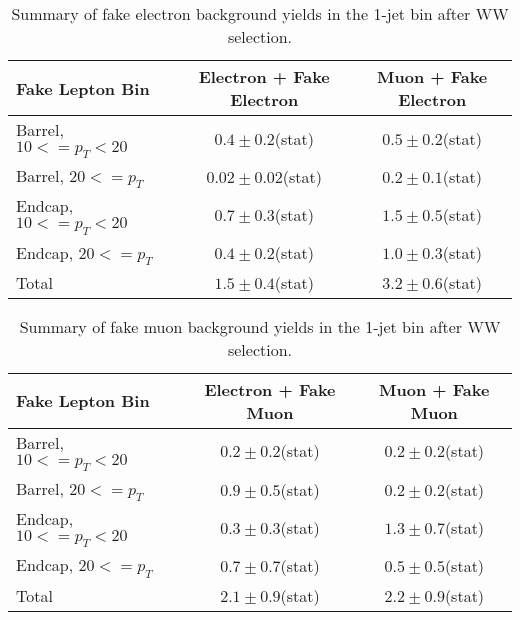\begin{table}[!htbp]
\begin{center}
\begin{tabular}{|l|c|c|}
\hline
Fake Lepton Bin               & Electron + Fake Electron & Muon + Fake Electron  \\
\hline
Barrel, $10 <= p_{T} < 20$    &  $0.4 \pm 0.2$(stat)     &   $0.5 \pm 0.2$(stat) \\
Barrel, $20 <= p_{T} $        &  $0.02 \pm 0.02$(stat)   &   $0.2 \pm 0.1$(stat) \\
Endcap, $10 <= p_{T} < 20$    &  $0.7 \pm 0.3$(stat)     &   $1.5 \pm 0.5$(stat) \\
Endcap, $20 <= p_{T} $        &  $0.4 \pm 0.2$(stat)     &   $1.0 \pm 0.3$(stat) \\
\hline
Total                         &  $1.5  \pm 0.4$(stat)    &   $3.2 \pm 0.6$(stat) \\
\hline
\end{tabular}
\caption{Summary of fake electron background yields in the 1-jet bin after WW selection. }
\label{tab:FakeElectronBkgPrediction_WWSelection_1JetBin}
\end{center}
\end{table}


\begin{table}[!htbp]
\begin{center}
\begin{tabular}{|l|c|c|}
\hline
Fake Lepton Bin               & Electron + Fake Muon & Muon + Fake Muon  \\
\hline
Barrel, $10 <= p_{T} < 20$    &  $0.2 \pm 0.2$(stat)     &   $0.2 \pm 0.2$(stat) \\
Barrel, $20 <= p_{T} $        &  $0.9 \pm 0.5$(stat)     &   $0.2 \pm 0.2$(stat) \\
Endcap, $10 <= p_{T} < 20$    &  $0.3 \pm 0.3$(stat)     &   $1.3 \pm 0.7$(stat) \\
Endcap, $20 <= p_{T} $        &  $0.7 \pm 0.7$(stat)     &   $0.5 \pm 0.5$(stat) \\
\hline
Total                         &  $2.1 \pm 0.9$(stat)     &   $2.2 \pm 0.9$(stat) \\
\hline
\end{tabular}
\caption{Summary of fake muon background yields in the 1-jet bin after WW selection. }
\label{tab:FakeElectronBkgPrediction_WWSelection_1JetBin}
\end{center}
\end{table}






